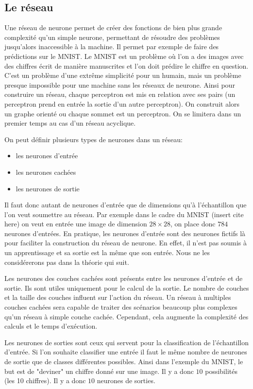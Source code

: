 \subsection{Le réseau}

Une réseau de neurone permet de créer des fonctions de bien plus grande complexité qu'un simple neurone, permettant de résoudre des problèmes jusqu'alors inaccessible à la machine. Il permet par exemple de faire des prédictions sur le MNIST. Le MNIST est un problème où l'on a des images avec des chiffres écrit de manière manuscrites et l'on doit prédire le chiffre en question. C'est un problème d'une extrême simplicité pour un humain, mais un problème presque impossible pour une machine sans les réseaux de neurone. Ainsi pour construire un réseau, chaque perceptron est mis en relation avec ses pairs (un perceptron prend en entrée la sortie d'un autre perceptron). On construit alors un graphe orienté ou chaque sommet est un perceptron. On se limitera dans un premier temps au cas d'un réseau acyclique.

On peut définir plusieurs types de neurones dans un réseau:
\begin{itemize}
\item les neurones d'entrée
\item les neurones cachées
\item les neurones de sortie
\end{itemize}

\vspace{\parskip}
Il faut donc autant de neurones d'entrée que de dimensions qu'à l'échantillon que l'on veut soumettre au réseau. Par exemple dans le cadre du MNIST (insert cite here) on veut en entrée une image de dimension $28 \times 28$, on place donc $784$ neurones d'entrées. En pratique, les neurones d'entrée sont des neurones fictifs là pour faciliter la construction du réseau de neurone. En effet, il n'est pas soumis à un apprentissage et sa sortie est la même que son entrée. Nous ne les considérerons pas dans la théorie qui suit.

Les neurones des couches cachées sont présents entre les neurones d'entrée et de sortie. Ils sont utiles uniquement pour le calcul de la sortie. Le nombre de couches et la taille des couches influent sur l'action du réseau. Un réseau à multiples couches cachées sera capable de traiter des scénarios beaucoup plus complexes qu'un réseau à simple couche cachée. Cependant, cela augmente la complexité des calculs et le temps d'exécution.

Les neurones de sorties sont ceux qui servent pour la classification de l'échantillon d'entrée. Si l'on souhaite classifier une entrée il faut le même nombre de neurones de sortie que de classes différentes possibles. Ainsi dans l'exemple du MNIST, le but est de "deviner" un chiffre donné sur une image. Il y a donc $10$ possibilités (les 10 chiffres). Il y a donc $10$ neurones de sorties.

